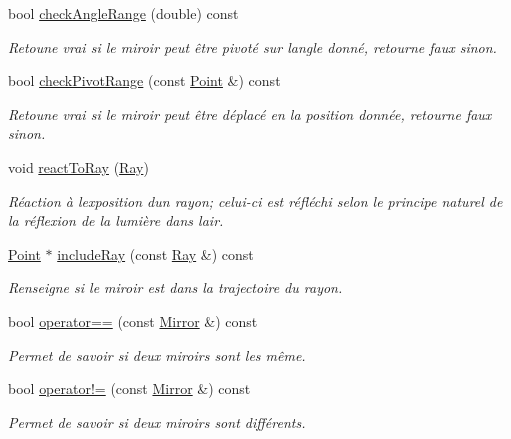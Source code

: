 \begin{DoxyCompactItemize}
bool \hyperlink{classMirror_aa4fc01092dae3dab55dd2e74af41f429}{check\+Angle\+Range} (double) const 
\begin{DoxyCompactList}\small\item\em Retoune vrai si le miroir peut être pivoté sur l\textquotesingle{}angle donné, retourne faux sinon. \end{DoxyCompactList}\item 
bool \hyperlink{classMirror_a52f096a72ba715cba18d5d3d79d507f4}{check\+Pivot\+Range} (const \hyperlink{classPoint}{Point} \&) const 
\begin{DoxyCompactList}\small\item\em Retoune vrai si le miroir peut être déplacé en la position donnée, retourne faux sinon. \end{DoxyCompactList}\item 
void \hyperlink{classMirror_a149fb6af1dcdcffd685b21019f189c72}{react\+To\+Ray} (\hyperlink{classRay}{Ray})
\begin{DoxyCompactList}\small\item\em Réaction à l\textquotesingle{}exposition d\textquotesingle{}un rayon; celui-\/ci est réfléchi selon le principe naturel de la réflexion de la lumière dans l\textquotesingle{}air. \end{DoxyCompactList}\item 
\hyperlink{classPoint}{Point} $\ast$ \hyperlink{classMirror_af9b8d54ae559b388cb04df6f8d391f47}{include\+Ray} (const \hyperlink{classRay}{Ray} \&) const 
\begin{DoxyCompactList}\small\item\em Renseigne si le miroir est dans la trajectoire du rayon. \end{DoxyCompactList}\item 
bool \hyperlink{classMirror_aca852b6cf22bec88a402d3b7e7c78ca9}{operator==} (const \hyperlink{classMirror}{Mirror} \&) const 
\begin{DoxyCompactList}\small\item\em Permet de savoir si deux miroirs sont les même. \end{DoxyCompactList}\item 
bool \hyperlink{classMirror_a0538deb5f7234df6cf635e3836d6dfae}{operator!=} (const \hyperlink{classMirror}{Mirror} \&) const 
\begin{DoxyCompactList}\small\item\em Permet de savoir si deux miroirs sont différents. \end{DoxyCompactList}\end{DoxyCompactItemize}
